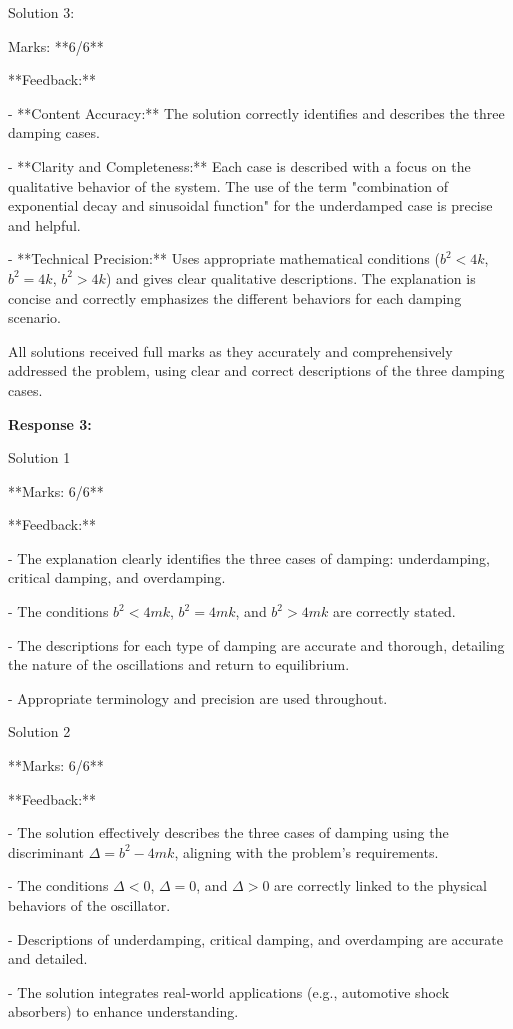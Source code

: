 \documentclass[a4paper,11pt]{article}
\begin{document}
Solution 3:

Marks: **6/6**

**Feedback:**

- **Content Accuracy:** The solution correctly identifies and describes the three damping cases.

- **Clarity and Completeness:** Each case is described with a focus on the qualitative behavior of the system. The use of the term "combination of exponential decay and sinusoidal function" for the underdamped case is precise and helpful.

- **Technical Precision:** Uses appropriate mathematical conditions (\(b^2 < 4k\), \(b^2 = 4k\), \(b^2 > 4k\)) and gives clear qualitative descriptions. The explanation is concise and correctly emphasizes the different behaviors for each damping scenario.

All solutions received full marks as they accurately and comprehensively addressed the problem, using clear and correct descriptions of the three damping cases.

\bigskip
\textbf{Response 3:}

Solution 1

**Marks: 6/6**

**Feedback:**

- The explanation clearly identifies the three cases of damping: underdamping, critical damping, and overdamping.

- The conditions \(b^2 < 4mk\), \(b^2 = 4mk\), and \(b^2 > 4mk\) are correctly stated.

- The descriptions for each type of damping are accurate and thorough, detailing the nature of the oscillations and return to equilibrium.

- Appropriate terminology and precision are used throughout.

Solution 2

**Marks: 6/6**

**Feedback:**

- The solution effectively describes the three cases of damping using the discriminant \(\Delta = b^2 - 4mk\), aligning with the problem's requirements.

- The conditions \(\Delta < 0\), \(\Delta = 0\), and \(\Delta > 0\) are correctly linked to the physical behaviors of the oscillator.

- Descriptions of underdamping, critical damping, and overdamping are accurate and detailed.

- The solution integrates real-world applications (e.g., automotive shock absorbers) to enhance understanding.
\end{document}
